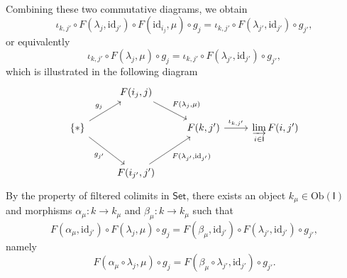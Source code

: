 \begin{prf}
\begin{enumerate}[(i)]
\[\begin{tikzcd}
\end{tikzcd}
\]
Combining these two commutative diagrams, we obtain
\[
    \iota_{k,j'}\circ F(\lambda_j,\mathrm{id}_{j'})\circ F(\mathrm{id}_{i_j},\mu)\circ g_j=\iota_{k,j'}\circ F(\lambda_{j'},\mathrm{id}_{j'})\circ g_{j'},
\]
or equivalently
\[
    \iota_{k,j'}\circ F(\lambda_j,\mu)\circ g_j=\iota_{k,j'}\circ F(\lambda_{j'},\mathrm{id}_{j'})\circ g_{j'},
\]
which is illustrated in the following diagram
\[
\begin{tikzcd}
    & {F(i_j,j)} \arrow[rd, "{F(\lambda_j,\mu)}"]                      &                                       &                                       \\
\{*\} \arrow[ru, "g_j"] \arrow[rd, "g_{j'}"'] &                                                                  & {F(k,j')} \arrow[r, "{\iota_{k,j'}}"] & {\varinjlim\limits_{i\in\mathsf{I}} F(i,j')} \\
    & {F(i_{j'},j')} \arrow[ru, "{F(\lambda_{j'},\mathrm{id}_{j'})}"'] &                                       &                                      
\end{tikzcd}
\]
By the property of filtered colimits in $\mathsf{Set}$, there exists an object $k_\mu\in \mathrm{Ob}(\mathsf{I})$ and morphisms $\alpha_\mu: k\to k_\mu$ and $\beta_\mu: k\to k_\mu$ such that 
\[
    F(\alpha_\mu,\mathrm{id}_{j'})\circ F(\lambda_j,\mu)\circ g_j=F(\beta_\mu,\mathrm{id}_{j'})\circ  F(\lambda_{j'},\mathrm{id}_{j'})\circ g_{j'},
\]
namely
\[
    F(\alpha_\mu\circ \lambda_j,\mu)\circ g_j=F(\beta_\mu\circ \lambda_{j'},\mathrm{id}_{j'})\circ g_{j'}.
\]


\end{enumerate}
\end{prf}
